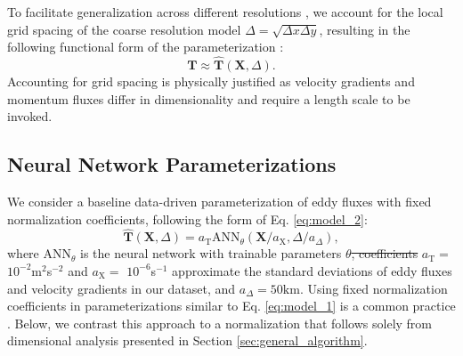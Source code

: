 \documentclass[draft]{agujournal2019}
\providecommand{\DIFadd}[1]{{\protect\color{blue}\uwave{#1}}} %
\providecommand{\DIFdel}[1]{{\protect\color{red}\sout{#1}}}                      %
\providecommand{\DIFaddbegin}{} %
\providecommand{\DIFaddend}{} %
\providecommand{\DIFdelbegin}{} %
\providecommand{\DIFdelend}{} %
\begin{document}
To facilitate generalization across different resolutions \cite<scale-aware or grid-aware parameterization,>{bachman2017scale}, we account for the local grid spacing of the coarse resolution model $\Delta = \sqrt{\Delta x \Delta y}$, resulting in the following functional form of the parameterization \cite{lund1993parameterization, li2025transformer}:
\begin{equation}
    \mathbf{T} \approx \widehat{\mathbf{T}}(\mathbf{X}, \Delta). \label{eq:model_2}
\end{equation}
Accounting for grid spacing is physically justified as velocity gradients and momentum fluxes differ in dimensionality and require a length scale to be invoked.

%

\subsection{Neural Network Parameterizations} \label{sec: eddy_param}

We consider a baseline data-driven parameterization of eddy fluxes with fixed normalization coefficients, following the form of Eq. \eqref{eq:model_2}:
\begin{equation}
\widehat{\mathbf{T}}(\mathbf{X}, \Delta) = a_{\mathrm{T}} \mathrm{ANN}_{\theta}(\mathbf{X} / a_{\mathrm{X}}, \Delta / a_{\Delta}), \label{eq:model_1}
\end{equation}
where $\mathrm{ANN}_{\theta}$ is the neural network with trainable parameters $\theta$\DIFdelbegin \DIFdel{, coefficients }\DIFdelend \DIFaddbegin \DIFadd{. Coefficients }\DIFaddend $a_{\mathrm{T}}=$$10^{-2}$m$^2$s$^{-2}$ and $a_{\mathrm{X}}=$ $10^{-6}$s$^{-1}$ approximate the standard deviations of eddy fluxes and velocity gradients in our dataset, and $a_{\Delta}=50 \mathrm{km}$.
Using fixed normalization coefficients in parameterizations similar to Eq. \eqref{eq:model_1} is a common practice \cite{srinivasan2024turbulence}. Below, we contrast this approach to a normalization that follows solely from dimensional analysis presented in Section \ref{sec:general_algorithm}.

\end{document}

